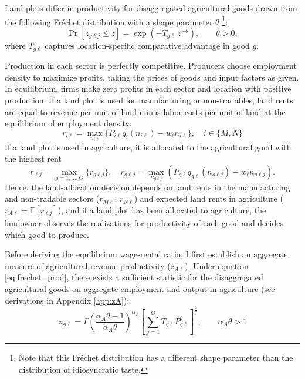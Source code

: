 \documentclass[11pt]{article}
\begin{document}
Land plots differ in productivity for disaggregated agricultural goods drawn from the following Fr\'echet distribution with a shape parameter $\theta$ \footnote{Note that this Fr\'echet distribution has a different shape parameter than the distribution of idiosyncratic taste.}:
\begin{equation}
\Pr\!\left[z_{g\ell j}\le z\right]
=
\exp\!\left(-T_{g\ell}\, z^{-\theta}\right),
\qquad \theta>0,
\label{eq:frechet_prod}
\end{equation}
where $T_{g\ell}$ captures location-specific comparative advantage in good $g$.

Production in each sector is perfectly competitive. Producers choose employment density to maximize profits, taking the prices of goods and input factors as given. In equilibrium, firms make zero profits in each sector and location with positive production. If a land plot is used for manufacturing or non-tradables, land rents are equal to revenue per unit of land minus labor costs per unit of land at the equilibrium of employment density: 
\begin{equation}
    r_{i\ell} = \max_{n_{i\ell}} \{ P_{i\ell} q_i (n_{i\ell}) - w_\ell n_{i\ell} \}, \quad  i \in  \{M, N\}
\end{equation}
If a land plot is used in agriculture, it is allocated to the agricultural good with the highest rent
\begin{equation}
    r_{\ell j} = \max_{g=1, \ldots, G} \{r_{g\ell j}\}, \quad
    r_{g\ell j} = \max_{n_{g\ell j}} \left( P_{g\ell} q_{g\ell} (n_{g\ell j}) - w_{\ell} n_{g\ell j} \right).
\label{eq:landalloc}
\end{equation}
Hence, the land-allocation decision depends on land rents in the manufacturing and non-tradable sectors ($r_{M\ell}$, $r_{N\ell}$) and expected land rents in agriculture ($r_{A\ell}=\mathbb{E}[r_{\ell j}]$), and if a land plot has been allocated to agriculture, the landowner observes the realizations for productivity of each good and decides which good to produce.

Before deriving the equilibrium wage-rental ratio, I first establish an aggregate measure of agricultural revenue productivity ($z_{A\ell}$). Under equation \eqref{eq:frechet_prod}, there exists a sufficient statistic for the disaggregated agricultural goods on aggregate employment and output in agriculture (see derivations in Appendix \ref{app:zA}):
\begin{equation}
z_{A\ell}
=
\Gamma\!\left(\frac{\alpha_A\theta-1}{\alpha_A\theta}\right)^{\alpha_A}
\left[
\sum_{g=1}^G T_{g\ell} P_{g\ell}^\theta
\right]^{\frac{1}{\theta}}, \qquad \alpha_A\theta>1
\label{eq:zA}
\end{equation}
\end{document}
